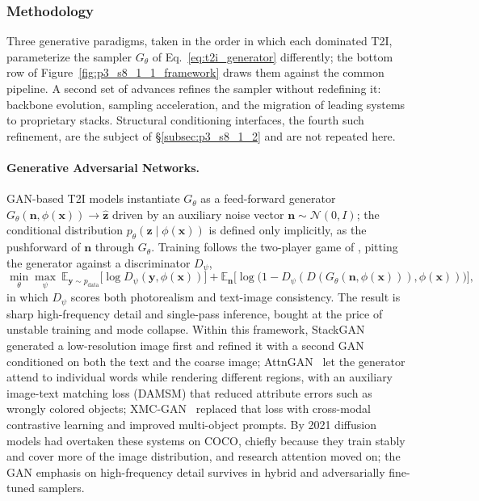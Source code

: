 \subsubsection{Methodology}

Three generative paradigms, taken in the order in which each dominated T2I, parameterize the sampler $G_\theta$ of Eq.~\eqref{eq:t2i_generator} differently; the bottom row of Figure~\ref{fig:p3_s8_1_1_framework} draws them against the common pipeline.
A second set of advances refines the sampler without redefining it: backbone evolution, sampling acceleration, and the migration of leading systems to proprietary stacks.
Structural conditioning interfaces, the fourth such refinement, are the subject of §\ref{subsec:p3_s8_1_2} and are not repeated here.

\paragraph{Generative Adversarial Networks.}\label{para:p3_s8_1_1_gan}
GAN-based T2I models instantiate $G_\theta$ as a feed-forward generator $G_\theta(\mathbf{n},\phi(\mathbf{x}))\!\to\!\hat{\mathbf{z}}$ driven by an auxiliary noise vector $\mathbf{n}\sim\mathcal{N}(0,I)$; the conditional distribution $p_\theta(\mathbf{z}\mid\phi(\mathbf{x}))$ is defined only implicitly, as the pushforward of $\mathbf{n}$ through $G_\theta$.
Training follows the two-player game of \citet{goodfellow2014gan}, pitting the generator against a discriminator $D_\psi$,
\begin{equation}
\min_\theta \max_\psi\ \mathbb{E}_{\mathbf{y}\sim p_\text{data}}\!\big[\log D_\psi(\mathbf{y},\phi(\mathbf{x}))\big] + \mathbb{E}_{\mathbf{n}}\!\big[\log\!\big(1-D_\psi(D(G_\theta(\mathbf{n},\phi(\mathbf{x}))),\phi(\mathbf{x}))\big)\big],
\label{eq:t2i_gan_objective}
\end{equation}
in which $D_\psi$ scores both photorealism and text-image consistency.
The result is sharp high-frequency detail and single-pass inference, bought at the price of unstable training and mode collapse.
Within this framework, StackGAN~\cite{stackgan2017} generated a low-resolution image first and refined it with a second GAN conditioned on both the text and the coarse image; AttnGAN~\cite{attngan2018} let the generator attend to individual words while rendering different regions, with an auxiliary image-text matching loss (DAMSM) that reduced attribute errors such as wrongly colored objects; XMC-GAN~\cite{xmcgan2021} replaced that loss with cross-modal contrastive learning and improved multi-object prompts.
By 2021 diffusion models had overtaken these systems on COCO, chiefly because they train stably and cover more of the image distribution, and research attention moved on; the GAN emphasis on high-frequency detail survives in hybrid and adversarially fine-tuned samplers.

